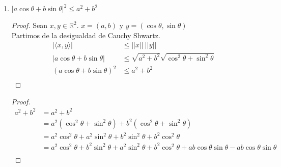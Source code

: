 \documentclass[11pt]{article}
\begin{document}
\begin{enumerate}
    $\mathbb{R}^n$ talque
    $V = [\alpha]$\\
    $H=\left\{x \in \mathbb{R}^{n} / \langle \alpha, x \rangle=0\right\}$ \\
    \begin{proof} Quiero ver que $V \oplus H = \mathbb{R}^n$.\\
      Por la definición de \textit{suma directa} dada en clase;
        \begin{center}
        \end{center}
	  Como en el ejercicio \textbf{3} probamos que $V \cap H = \{0\}$, 
      entonces por la definición de suma directa 
      \[ V \oplus H = \mathbb{R}^n \]
    \end{proof}
  \item $|a \cos \theta+b \sin \theta|^{2} \leq a^{2}+b^{2}$         
    \begin{proof} Sean $x, y \in \mathbb{R}^2$.
      $x = (a, b)$ y
      $y = (\cos \theta, \sin \theta)$\\
      Partimos de la desigualdad de Cauchy Shwartz.
      \[\begin{aligned}
      |\langle x, y \rangle | &\leq ||x|| \ ||y|| \\
      |a \cos \theta + b \sin \theta| &\leq \sqrt{a^2 + b^2} 
      \sqrt{\cos^2 \theta + \sin^2 \theta}\\
      (a \cos \theta + b \sin \theta)^2 &\leq a^2 + b^2\\
      \end{aligned}\]
    \end{proof}
  \begin{proof}
    \[ \begin{aligned}
      a^2 + b^2 &=  a^2 + b^2 \\
      &= a^2 (\cos^2 \theta + \sin^2 \theta) + b^2 (\cos^2 \theta + \sin^2 \theta)\\
      &= a^2 \cos^2 \theta + a^2 \sin^2 \theta +b^2 \sin^2 \theta + b^2 \cos^2 \theta \\
      &= a^2 \cos^2 \theta + b^2 \sin^2 \theta  + a^2 \sin^2 \theta +b^2 \cos^2
              \theta+ab \cos \theta \sin \theta-ab\cos\theta \sin \theta\\              

\end{aligned}\]
\end{proof}
\end{enumerate}
\end{document}
